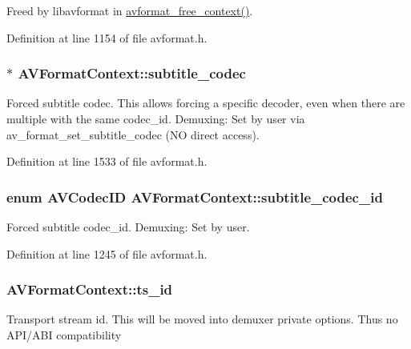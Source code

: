 Freed by libavformat in \hyperlink{group__lavf__core_gac2990b13b68e831a408fce8e1d0d6445}{avformat\+\_\+free\+\_\+context()}. 

Definition at line 1154 of file avformat.\+h.

\subsubsection[{\texorpdfstring{subtitle\+\_\+codec}{subtitle_codec}}]{$\ast$ A\+V\+Format\+Context\+::subtitle\+\_\+codec}\hypertarget{struct_a_v_format_context_a9cc6a317755fa4f65b0bab36bcb18c87}{}\label{struct_a_v_format_context_a9cc6a317755fa4f65b0bab36bcb18c87}
Forced subtitle codec. This allows forcing a specific decoder, even when there are multiple with the same codec\+\_\+id. Demuxing\+: Set by user via av\+\_\+format\+\_\+set\+\_\+subtitle\+\_\+codec (NO direct access). 

Definition at line 1533 of file avformat.\+h.

\subsubsection[{\texorpdfstring{subtitle\+\_\+codec\+\_\+id}{subtitle_codec_id}}]{\setlength{\rightskip}{0pt plus 5cm}enum {\bf A\+V\+Codec\+ID} A\+V\+Format\+Context\+::subtitle\+\_\+codec\+\_\+id}\hypertarget{struct_a_v_format_context_acca61846d663b15e5a56b35c903e4d3b}{}\label{struct_a_v_format_context_acca61846d663b15e5a56b35c903e4d3b}
Forced subtitle codec\+\_\+id. Demuxing\+: Set by user. 

Definition at line 1245 of file avformat.\+h.

\subsubsection[{\texorpdfstring{ts\+\_\+id}{ts_id}}]{ A\+V\+Format\+Context\+::ts\+\_\+id}\hypertarget{struct_a_v_format_context_a5d331e9a0609a93dd4593af6c118cc4b}{}\label{struct_a_v_format_context_a5d331e9a0609a93dd4593af6c118cc4b}
Transport stream id. This will be moved into demuxer private options. Thus no A\+P\+I/\+A\+BI compatibility 

